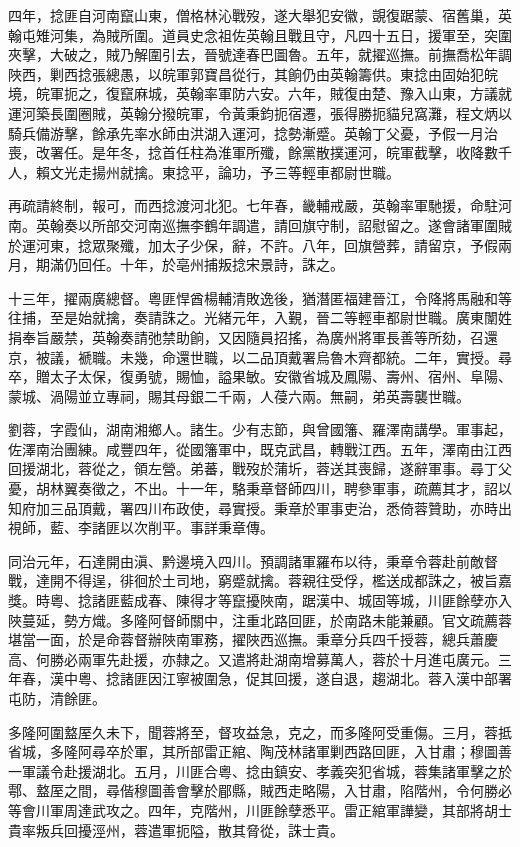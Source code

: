 \begin{pinyinscope}
四年，捻匪自河南竄山東，僧格林沁戰歿，遂大舉犯安徽，覬復踞蒙、宿舊巢，英翰屯雉河集，為賊所圍。道員史念祖佐英翰且戰且守，凡四十五日，援軍至，突圍夾擊，大破之，賊乃解圍引去，晉號達春巴圖魯。五年，就擢巡撫。前撫喬松年調陜西，剿西捻張總愚，以皖軍郭寶昌從行，其餉仍由英翰籌供。東捻由固始犯皖境，皖軍扼之，復竄麻城，英翰率軍防六安。六年，賊復由楚、豫入山東，方議就運河築長圍圈賊，英翰分撥皖軍，令黃秉鈞扼宿遷，張得勝扼貓兒窩灘，程文炳以騎兵備游擊，餘承先率水師由洪湖入運河，捻勢漸蹙。英翰丁父憂，予假一月治喪，改署任。是年冬，捻首任柱為淮軍所殲，餘黨散撲運河，皖軍截擊，收降數千人，賴文光走揚州就擒。東捻平，論功，予三等輕車都尉世職。

再疏請終制，報可，而西捻渡河北犯。七年春，畿輔戒嚴，英翰率軍馳援，命駐河南。英翰奏以所部交河南巡撫李鶴年調遣，請回旗守制，詔慰留之。遂會諸軍圍賊於運河東，捻眾聚殲，加太子少保，辭，不許。八年，回旗營葬，請留京，予假兩月，期滿仍回任。十年，於亳州捕叛捻宋景詩，誅之。

十三年，擢兩廣總督。粵匪悍酋楊輔清敗逸後，猶潛匿福建晉江，令降將馬融和等往捕，至是始就擒，奏請誅之。光緒元年，入覲，晉二等輕車都尉世職。廣東闈姓捐奉旨嚴禁，英翰奏請弛禁助餉，又因隨員招搖，為廣州將軍長善等所劾，召還京，被議，褫職。未幾，命還世職，以二品頂戴署烏魯木齊都統。二年，實授。尋卒，贈太子太保，復勇號，賜恤，謚果敏。安徽省城及鳳陽、壽州、宿州、阜陽、蒙城、渦陽並立專祠，賜其母銀二千兩，人葠六兩。無嗣，弟英壽襲世職。

劉蓉，字霞仙，湖南湘鄉人。諸生。少有志節，與曾國籓、羅澤南講學。軍事起，佐澤南治團練。咸豐四年，從國籓軍中，既克武昌，轉戰江西。五年，澤南由江西回援湖北，蓉從之，領左營。弟蕃，戰歿於蒲圻，蓉送其喪歸，遂辭軍事。尋丁父憂，胡林翼奏徵之，不出。十一年，駱秉章督師四川，聘參軍事，疏薦其才，詔以知府加三品頂戴，署四川布政使，尋實授。秉章於軍事吏治，悉倚蓉贊助，亦時出視師，藍、李諸匪以次削平。事詳秉章傳。

同治元年，石達開由滇、黔邊境入四川。預調諸軍羅布以待，秉章令蓉赴前敵督戰，達開不得逞，徘徊於土司地，窮蹙就擒。蓉親往受俘，檻送成都誅之，被旨嘉獎。時粵、捻諸匪藍成春、陳得才等竄擾陜南，踞漢中、城固等城，川匪餘孽亦入陜蔓延，勢方熾。多隆阿督師關中，注重北路回匪，於南路未能兼顧。官文疏薦蓉堪當一面，於是命蓉督辦陜南軍務，擢陜西巡撫。秉章分兵四千授蓉，總兵蕭慶高、何勝必兩軍先赴援，亦隸之。又遣將赴湖南增募萬人，蓉於十月進屯廣元。三年春，漢中粵、捻諸匪因江寧被圍急，促其回援，遂自退，趨湖北。蓉入漢中部署屯防，清餘匪。

多隆阿圍盩厔久未下，聞蓉將至，督攻益急，克之，而多隆阿受重傷。三月，蓉抵省城，多隆阿尋卒於軍，其所部雷正綰、陶茂林諸軍剿西路回匪，入甘肅；穆圖善一軍議令赴援湖北。五月，川匪合粵、捻由鎮安、孝義突犯省城，蓉集諸軍擊之於鄠、盩厔之間，尋偕穆圖善會擊於郿縣，賊西走略陽，入甘肅，陷階州，令何勝必等會川軍周達武攻之。四年，克階州，川匪餘孽悉平。雷正綰軍譁變，其部將胡士貴率叛兵回擾涇州，蓉遣軍扼隘，散其脅從，誅士貴。


\end{pinyinscope}
